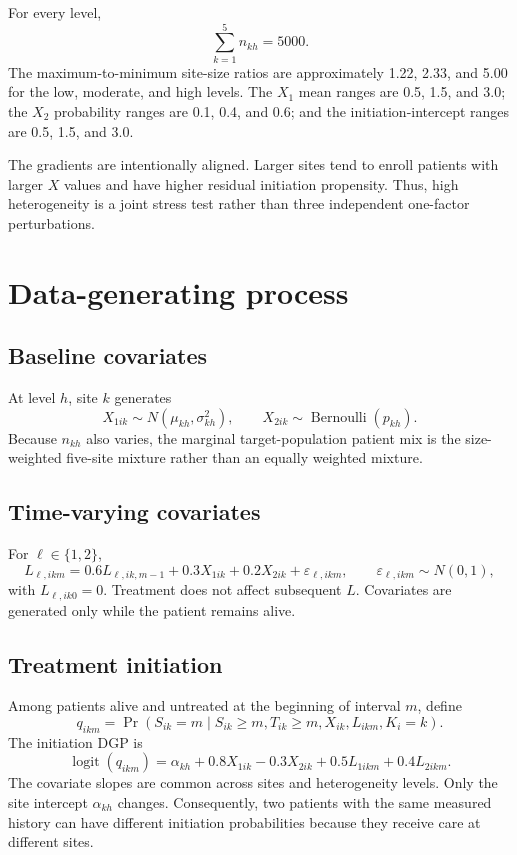 \documentclass[11pt]{article}
\newcommand{\Prb}{\operatorname{Pr}}
\begin{document}
For every level,
\[
  \sum_{k=1}^5 n_{kh}=5000.
\]
The maximum-to-minimum site-size ratios are approximately 1.22, 2.33, and
5.00 for the low, moderate, and high levels. The $X_1$ mean ranges are 0.5,
1.5, and 3.0; the $X_2$ probability ranges are 0.1, 0.4, and 0.6; and the
initiation-intercept ranges are 0.5, 1.5, and 3.0.

The gradients are intentionally aligned. Larger sites tend to enroll patients
with larger $X$ values and have higher residual initiation propensity. Thus,
high heterogeneity is a joint stress test rather than three independent
one-factor perturbations.

\section{Data-generating process}

\subsection{Baseline covariates}

At level $h$, site $k$ generates
\[
  X_{1ik}\sim N(\mu_{kh},\sigma_{kh}^2),
  \qquad
  X_{2ik}\sim\operatorname{Bernoulli}(p_{kh}).
\]
Because $n_{kh}$ also varies, the marginal target-population patient mix is
the size-weighted five-site mixture rather than an equally weighted mixture.

\subsection{Time-varying covariates}

For $\ell\in\{1,2\}$,
\begin{equation}
\label{eq:L-dgp}
  L_{\ell,ikm}
  =0.6L_{\ell,ik,m-1}
   +0.3X_{1ik}
   +0.2X_{2ik}
   +\varepsilon_{\ell,ikm},
  \qquad
  \varepsilon_{\ell,ikm}\sim N(0,1),
\end{equation}
with $L_{\ell,ik0}=0$. Treatment does not affect subsequent $L$. Covariates
are generated only while the patient remains alive.

\subsection{Treatment initiation}

Among patients alive and untreated at the beginning of interval $m$, define
\[
  q_{ikm}
  =\Prb(S_{ik}=m\mid S_{ik}\geq m,T_{ik}\geq m,
                         X_{ik},L_{ikm},K_i=k).
\]
The initiation DGP is
\begin{equation}
\label{eq:init-dgp}
  \operatorname{logit}(q_{ikm})
  =\alpha_{kh}
   +0.8X_{1ik}
   -0.3X_{2ik}
   +0.5L_{1ikm}
   +0.4L_{2ikm}.
\end{equation}
The covariate slopes are common across sites and heterogeneity levels. Only
the site intercept $\alpha_{kh}$ changes. Consequently, two patients with the
same measured history can have different initiation probabilities because
they receive care at different sites.
\end{document}
